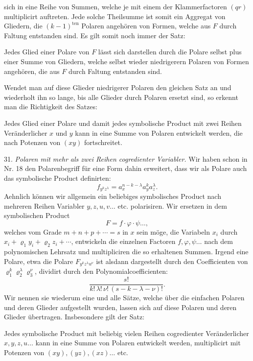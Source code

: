 sich in eine Reihe von Summen, welche je mit einem der Klammerfactoren $(qr)$ multiplicirt auftreten. Jede solche Theilsumme ist somit ein Aggregat von Gliedern, die $(k-1)^{\text{ten}}$ Polaren angehören von Formen, welche aus $F$ durch Faltung entstanden sind. Es gilt somit noch immer der Satz:

\glqq Jedes Glied einer Polare von $F$ lässt sich darstellen durch die Polare selbst plus einer Summe von Gliedern, welche selbst wieder niedrigerern Polaren von Formen angehören, die aus $F$ durch Faltung entstanden sind.\grqq{} %

Wendet man auf diese Glieder niedrigerer Polaren den gleichen Satz an und wiederholt ihn so lange, bis alle Glieder durch Polaren ersetzt sind, so erkennt man die Richtigkeit des Satzes:

\glqq Jedes Glied einer Polare und damit jedes symbolische Product mit zwei Reihen Veränderlicher $x$ und $y$ kann in eine Summe von Polaren entwickelt werden, die nach Potenzen von $(xy)$ fortschreitet.\grqq{}

31. \textit{Polaren mit mehr als zwei Reihen cogredienter Variabler.} Wir haben schon in Nr. 18 den Polarenbegriff für eine Form dahin erweitert, dass wir als Polare auch das symbolische Product definirten:
\[
f_{y^k z^{\lambda}} = a_x^{n-k-\lambda} a_y^k a_z^{\lambda} .
\]
Aehnlich können wir allgemein ein beliebiges symbolisches Product nach mehreren Reihen Variabler $y, z, u, v \ldots$ etc. polarisiren. Wir ersetzen in dem symbolischen Product
\[
F = f \cdot \varphi \cdot \psi \ldots ,
\]
welches vom Grade $m + n + p + \cdots = s$ in $x$ sein möge, die Variabeln $x_i$ durch $x_i + \varrho_1 y_i + \varrho_2 z_i + \cdots$, entwickeln die einzelnen Factoren $f, \varphi, \psi \ldots$ nach dem polynomischen Lehrsatz und multipliciren die so erhaltenen Summen. Irgend eine Polare, etwa die Polare $F_{y^k z^{\lambda} u^{\nu}}$ ist alsdann dargestellt durch den Coefficienten von $\varrho_1^k \varrho_2^{\lambda} \varrho_3^{\nu}$, dividirt durch den Polynomialcoefficienten:
\[
\frac{s!}{k! \, \lambda! \, \nu! \, (s-k-\lambda-\nu)!} .
\]
Wir nennen sie wiederum eine  und alle Sätze, welche über die einfachen Polaren und deren Glieder aufgestellt wurden, lassen sich auf diese Polaren und deren Glieder übertragen. Insbesondere gilt der Satz:

\glqq Jedes symbolische Product mit beliebig vielen Reihen cogredienter Veränderlicher $x, y, z, u \ldots$ kann in eine Summe von Polaren entwickelt werden, multiplicirt mit Potenzen von $(xy), (yz), (xz) \ldots$ etc.


